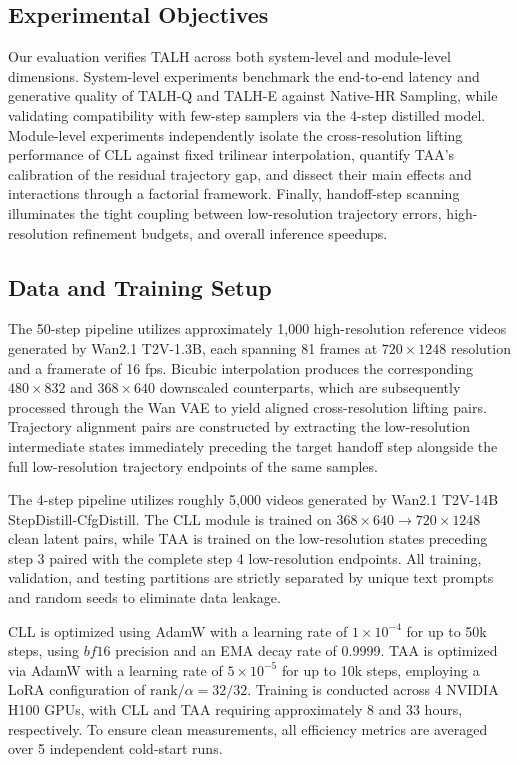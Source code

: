 \subsection{Experimental Objectives}

Our evaluation verifies TALH across both system-level and module-level
dimensions. System-level experiments benchmark the end-to-end latency
and generative quality of TALH-Q and TALH-E against Native-HR Sampling,
while validating compatibility with few-step samplers via the 4-step
distilled model. Module-level experiments independently isolate the
cross-resolution lifting performance of CLL against fixed trilinear
interpolation, quantify TAA's calibration of the residual trajectory
gap, and dissect their main effects and interactions through a factorial
framework. Finally, handoff-step scanning illuminates the tight coupling
between low-resolution trajectory errors, high-resolution refinement
budgets, and overall inference speedups.

\subsection{Data and Training Setup}

The 50-step pipeline utilizes approximately 1,000 high-resolution
reference videos generated by Wan2.1 T2V-1.3B, each spanning 81 frames
at \(720\times1248\) resolution and a framerate of 16 fps. Bicubic
interpolation produces the corresponding \(480\times832\) and
\(368\times640\) downscaled counterparts, which are subsequently
processed through the Wan VAE to yield aligned cross-resolution lifting
pairs. Trajectory alignment pairs are constructed by extracting the
low-resolution intermediate states immediately preceding the target
handoff step alongside the full low-resolution trajectory endpoints of
the same samples.

The 4-step pipeline utilizes roughly 5,000 videos generated by Wan2.1
T2V-14B StepDistill-CfgDistill. The CLL module is trained on
\(368\times640 \rightarrow 720\times1248\) clean latent pairs, while TAA
is trained on the low-resolution states preceding step 3 paired with the
complete step 4 low-resolution endpoints. All training, validation, and
testing partitions are strictly separated by unique text prompts and
random seeds to eliminate data leakage.

CLL is optimized using AdamW with a learning rate of \(1\times10^{-4}\)
for up to 50k steps, using \(bf16\) precision and an EMA decay rate of
0.9999. TAA is optimized via AdamW with a learning rate of
\(5\times10^{-5}\) for up to 10k steps, employing a LoRA configuration
of \(\text{rank}/\alpha = 32/32\). Training is conducted across 4 NVIDIA
H100 GPUs, with CLL and TAA requiring approximately 8 and 33 hours,
respectively. To ensure clean measurements, all efficiency metrics are
averaged over 5 independent cold-start runs.

